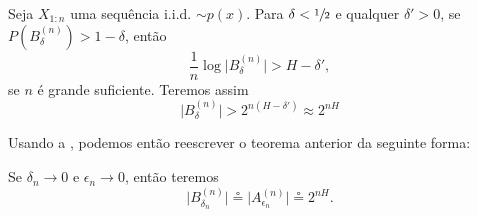 \begin{theorem}
Seja $X_{1:n}$ uma sequência i.i.d. $\sim p(x)$. Para $\delta < \sfrac{1}{2}$ e qualquer $\delta' > 0$,
se $P(B_{\delta}^{(n)}) > 1 - \delta$, então
\begin{equation}
\frac{1}{n} \log \vert B_{\delta}^{(n)} \vert >  H - \delta',
\end{equation}
se $n$ é grande suficiente. Teremos assim
\begin{equation}
\vert B_{\delta}^{(n)} \vert > 2^{n(H-\delta')} \approx 2^{nH}
\end{equation}

Usando a , podemos então reescrever o teorema anterior da seguinte forma:

Se $\delta_n \rightarrow 0$ e $\epsilon_n \rightarrow 0$, então teremos
\begin{equation}
\vert B_{\delta_n}^{(n)} \vert \circeq \vert A_{\epsilon_n}^{(n)} \vert \circeq 2^{nH}.
\end{equation}
\end{theorem}
